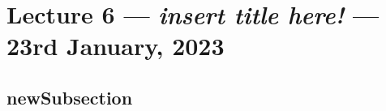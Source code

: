 \section{Lecture 6 --- \textit{insert title here!} --- 23rd January, 2023}

\subsection{newSubsection}
